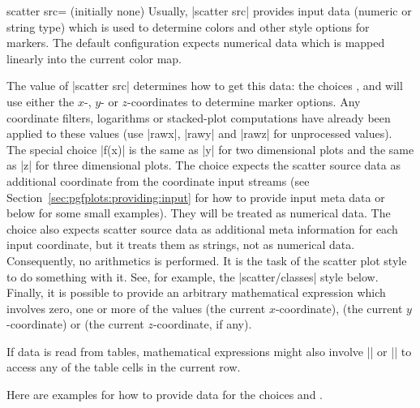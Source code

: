 {\begin{pgfplotskey}{scatter src= (initially none)%
}
    Usually, |scatter src| provides input data (numeric or string type) which
    is used to determine colors and other style options for markers. The
    default configuration expects numerical data which is mapped linearly into
    the current color map.

    The value of |scatter src| determines how to get this data: the choices
    ,  and  will use either the
    $x$-, $y$- or $z$-coordinates to determine marker options. Any coordinate
    filters, logarithms or stacked-plot computations have already been applied
    to these values (use |rawx|, |rawy| and |rawz| for unprocessed values). The
    special choice |f(x)| is the same as |y| for two dimensional plots and the
    same as |z| for three dimensional plots. The choice 
    expects the scatter source data as additional coordinate from the
    coordinate input streams (see Section~\ref{sec:pgfplots:providing:input} for
    how to provide input meta data or below for some small examples). They will
    be treated as numerical data. The choice 
    also expects scatter source data as additional meta information for each
    input coordinate, but it treats them as strings, not as numerical data.
    Consequently, no arithmetics is performed. It is the task of the scatter
    plot style to do something with it. See, for example, the |scatter/classes|
    style below. Finally, it is possible to provide an arbitrary mathematical
    expression which involves zero, one or more of the values 
    (the current $x$-coordinate),  (the current $y$-coordinate)
    or  (the current $z$-coordinate, if any).

    If data is read from tables, mathematical expressions might also involve
    |\thisrow| or |\thisrowno| to access
    any of the table cells in the current row.

    Here are examples for how to provide data for the choices
     and .
\begin{codeexample}
\end{codeexample}
\end{pgfplotskey}}
